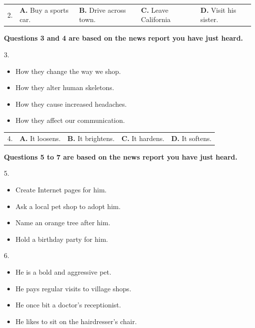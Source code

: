 \documentclass[UTF8,11pt]{ctexart}
\begin{document}
\noindent\begin{tabularx}{\linewidth}{@{}lXXXX@{}}2. & \textbf{A.} Buy a sports car. & \textbf{B.} Drive across town. & \textbf{C.} Leave California & \textbf{D.} Visit his sister.\\\end{tabularx}\par

\textbf{Questions 3 and 4 are based on the news report you have just heard.}


3.


\begin{itemize}[leftmargin=2em,itemsep=.2em,topsep=.4em]\item[A.] How they change the way we shop.
\item[B.] How they alter human skeletons.
\item[C.] How they cause increased headaches.
\item[D.] How they affect our communication.
\end{itemize}

\noindent\begin{tabularx}{\linewidth}{@{}lXXXX@{}}4. & \textbf{A.} It loosens. & \textbf{B.} It brightens. & \textbf{C.} It hardens. & \textbf{D.} It softens.\\\end{tabularx}\par

\textbf{Questions 5 to 7 are based on the news report you have just heard.}


5.


\begin{itemize}[leftmargin=2em,itemsep=.2em,topsep=.4em]\item[A.] Create Internet pages for him.
\item[B.] Ask a local pet shop to adopt him.
\item[C.] Name an orange tree after him.
\item[D.] Hold a birthday party for him.
\end{itemize}

6.


\begin{itemize}[leftmargin=2em,itemsep=.2em,topsep=.4em]\item[A.] He is a bold and aggressive pet.
\item[B.] He pays regular visits to village shops.
\item[C.] He once bit a doctor’s receptionist.
\item[D.] He likes to sit on the hairdresser’s chair.
\end{itemize}
\end{document}
